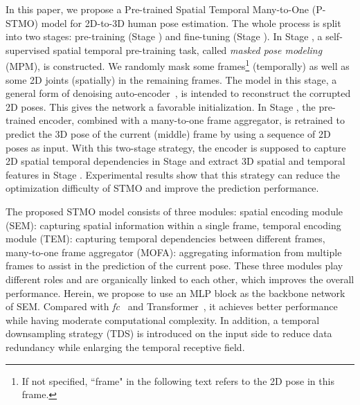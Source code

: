 \documentclass[]{llncs}
\newcommand{\RNum}[1]{\uppercase\expandafter{\romannumeral #1\relax}}
\begin{document}
In this paper, we propose a Pre-trained Spatial Temporal Many-to-One (P-STMO) model for 2D-to-3D human pose estimation. The whole process is split into two stages: pre-training (Stage \RNum{1}) and fine-tuning (Stage \RNum{2}). In Stage \RNum{1}, a self-supervised spatial temporal pre-training task, called \emph{masked pose modeling} (MPM), is constructed. We randomly mask some frames\footnote{If not specified, ``frame" in the following text refers to the 2D pose in this frame.} (temporally) as well as some 2D joints (spatially) in the remaining frames. The model in this stage, a general form of denoising auto-encoder~\cite{vincent2008extracting}, is intended to reconstruct the corrupted 2D poses. This gives the network a favorable initialization. In Stage \RNum{2}, the pre-trained encoder, combined with a many-to-one frame aggregator, is retrained to predict the 3D pose of the current (middle) frame by using a sequence of 2D poses as input. With this two-stage strategy, the encoder is supposed to capture 2D spatial temporal dependencies in Stage \RNum{1} and extract 3D spatial and temporal features in Stage \RNum{2}. Experimental results show that this strategy can reduce the optimization difficulty of STMO and improve the prediction performance.

The proposed STMO model consists of three modules:  spatial encoding module (SEM): capturing spatial information within a single frame,  temporal encoding module (TEM): capturing temporal dependencies between different frames,  many-to-one frame aggregator (MOFA): aggregating information from multiple frames to assist in the prediction of the current pose. These three modules play different roles and are organically linked to each other, which improves the overall performance. Herein, we propose to use an MLP block as the backbone network of SEM. Compared with \emph{fc}~\cite{li2022exploiting} and Transformer~\cite{zheng20213d}, it achieves better performance while having moderate computational complexity. In addition, a temporal downsampling strategy (TDS) is introduced on the input side to reduce data redundancy while enlarging the temporal receptive field. 
\end{document}
